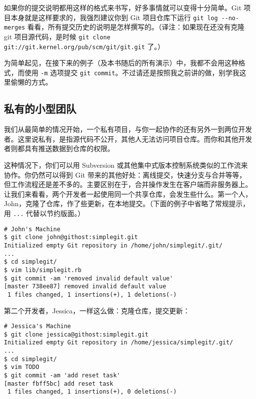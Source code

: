 \documentclass[a4paper]{book}
\begin{document}
如果你的提交说明都用这样的格式来书写，好多事情就可以变得十分简单。Git 项目本身就是这样要求的，我强烈建议你到 Git 项目仓库下运行 \texttt{git log -{}-no-merges} 看看，所有提交历史的说明是怎样撰写的。（译注：如果现在还没有克隆 git 项目源代码，是时候 \texttt{git clone git://git.kernel.org/pub/scm/git/git.git} 了。）

为简单起见，在接下来的例子（及本书随后的所有演示）中，我都不会用这种格式，而使用 \texttt{-m} 选项提交 \texttt{git commit}。不过请还是按照我之前讲的做，别学我这里偷懒的方式。

\subsection{私有的小型团队}

我们从最简单的情况开始，一个私有项目，与你一起协作的还有另外一到两位开发者。这里说私有，是指源代码不公开，其他人无法访问项目仓库。而你和其他开发者则都具有推送数据到仓库的权限。

这种情况下，你们可以用 Subversion 或其他集中式版本控制系统类似的工作流来协作。你仍然可以得到 Git 带来的其他好处：离线提交，快速分支与合并等等，但工作流程还是差不多的。主要区别在于，合并操作发生在客户端而非服务器上。让我们来看看，两个开发者一起使用同一个共享仓库，会发生些什么。第一个人，John，克隆了仓库，作了些更新，在本地提交。（下面的例子中省略了常规提示，用 \texttt{...} 代替以节约版面。）

\begin{shaded}\begin{verbatim}
# John's Machine
$ git clone john@githost:simplegit.git
Initialized empty Git repository in /home/john/simplegit/.git/
...
$ cd simplegit/
$ vim lib/simplegit.rb 
$ git commit -am 'removed invalid default value'
[master 738ee87] removed invalid default value
 1 files changed, 1 insertions(+), 1 deletions(-)
\end{verbatim}\end{shaded}

第二个开发者，Jessica，一样这么做：克隆仓库，提交更新：

\begin{shaded}\begin{verbatim}
# Jessica's Machine
$ git clone jessica@githost:simplegit.git
Initialized empty Git repository in /home/jessica/simplegit/.git/
...
$ cd simplegit/
$ vim TODO 
$ git commit -am 'add reset task'
[master fbff5bc] add reset task
 1 files changed, 1 insertions(+), 0 deletions(-)
\end{verbatim}\end{shaded}
\end{document}
